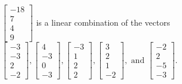 \begin{exercise}
\begin{exerciseStatement}
  \end{exerciseStatement}
  \begin{exerciseAnswer}
   \(\left[\begin{array}{c}
-18 \\
7 \\
4 \\
9
\end{array}\right]\) 
  	 is  
	a linear combination of the vectors \(\left[\begin{array}{c}
-3 \\
-3 \\
2 \\
-2
\end{array}\right] , \left[\begin{array}{c}
4 \\
-3 \\
0 \\
-3
\end{array}\right] , \left[\begin{array}{c}
-3 \\
1 \\
2 \\
2
\end{array}\right] , \left[\begin{array}{c}
3 \\
2 \\
1 \\
-2
\end{array}\right] , \text{ and } \left[\begin{array}{c}
-2 \\
2 \\
-5 \\
-3
\end{array}\right]\).

	
  


  \end{exerciseAnswer}
\end{exercise}